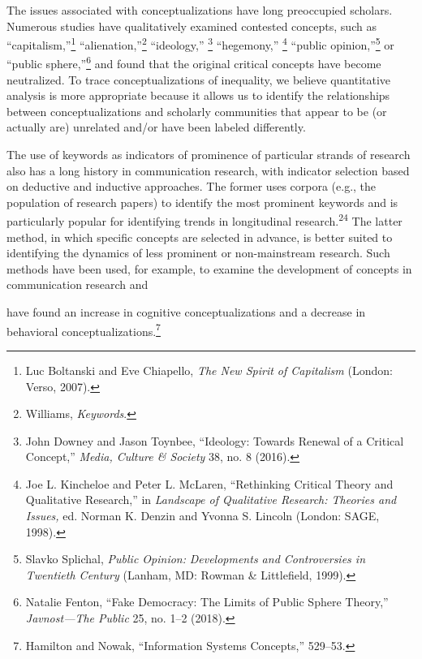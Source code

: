 \documentclass{tufte-handout}
\begin{document}
The issues associated with conceptualizations have long preoccupied
scholars. Numerous studies have qualitatively examined contested
concepts, such as ``capitalism,''\footnote{Luc Boltanski and Eve
  Chiapello, \emph{The New Spirit of Capitalism} (London: Verso, 2007).}
``alienation,''\footnote{Williams, \emph{Keywords}.} ``ideology,''
\footnote{John Downey and Jason Toynbee, ``Ideology: Towards Renewal of
  a Critical Concept,'' \emph{Media, Culture \& Society} 38, no. 8
  (2016).} ``hegemony,'' \footnote{Joe L. Kincheloe and Peter L.
  McLaren, ``Rethinking Critical Theory and Qualitative Research,'' in
  \emph{Landscape of Qualitative Research: Theories and Issues,} ed.
  Norman K. Denzin and Yvonna S. Lincoln (London: SAGE, 1998).} ``public
opinion,''\footnote{Slavko Splichal, \emph{Public Opinion:}
  \emph{Developments and Controversies in Twentieth Century} (Lanham,
  MD: Rowman \& Littlefield, 1999).} or ``public sphere,''\footnote{Natalie
  Fenton, ``Fake Democracy: The Limits of Public Sphere Theory,''
  \emph{Javnost---The Public} 25, no. 1--2 (2018).} and found that the
original critical concepts have become neutralized. To trace
conceptualizations of inequality, we believe quantitative analysis is
more appropriate because it allows us to identify the relationships
between conceptualizations and scholarly communities that appear to be
(or actually are) unrelated and/or have been labeled differently.

The use of keywords as indicators of prominence of particular strands of
research also has a long history in communication research, with
indicator selection based on deductive and inductive approaches. The
former uses corpora (e.g., the population of research papers) to
identify the most prominent keywords and is particularly popular for
identifying trends in longitudinal research.\textsuperscript{24} The latter method, in which
specific concepts are selected in advance, is better suited to
identifying the dynamics of less prominent or non-mainstream research.
Such methods have been used, for example, to examine the development of
concepts in communication research and\newpage

\noindent have found an increase in
cognitive conceptualizations and a decrease in behavioral
conceptualizations.\footnote{Hamilton and Nowak, ``Information Systems
  Concepts,'' 529--53.}
\end{document}
